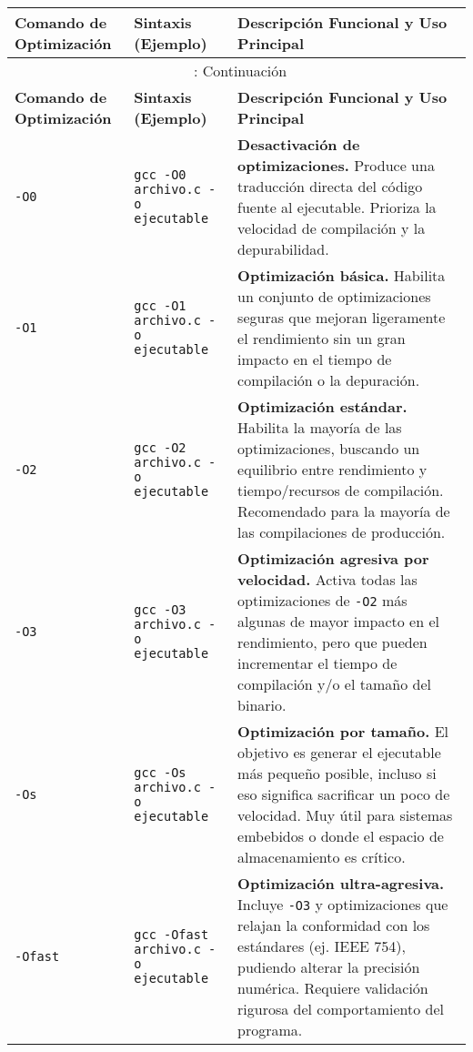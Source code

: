 \documentclass{article}
\begin{document}
	\begin{longtable}{l p{4.5cm} p{8cm}}
		\toprule
		\textbf{Comando de Optimización} & \textbf{Sintaxis (Ejemplo)} & \textbf{Descripción Funcional y Uso Principal} \\
		\midrule
		\endfirsthead
		\multicolumn{3}{c}{\tablename~\thetable{}: Continuación} \\
		\toprule
		\textbf{Comando de Optimización} & \textbf{Sintaxis (Ejemplo)} & \textbf{Descripción Funcional y Uso Principal} \\
		\midrule
		\endhead
		\bottomrule
		\endfoot
		\bottomrule
		\endlastfoot
		
		\texttt{-O0} & \texttt{gcc -O0 archivo.c -o ejecutable} & \textbf{Desactivación de optimizaciones.} Produce una traducción directa del código fuente al ejecutable. Prioriza la velocidad de compilación y la depurabilidad. \\
		\addlinespace
		\texttt{-O1} & \texttt{gcc -O1 archivo.c -o ejecutable} & \textbf{Optimización básica.} Habilita un conjunto de optimizaciones seguras que mejoran ligeramente el rendimiento sin un gran impacto en el tiempo de compilación o la depuración. \\
		\addlinespace
		\texttt{-O2} & \texttt{gcc -O2 archivo.c -o ejecutable} & \textbf{Optimización estándar.} Habilita la mayoría de las optimizaciones, buscando un equilibrio entre rendimiento y tiempo/recursos de compilación. Recomendado para la mayoría de las compilaciones de producción. \\
		\addlinespace
		\texttt{-O3} & \texttt{gcc -O3 archivo.c -o ejecutable} & \textbf{Optimización agresiva por velocidad.} Activa todas las optimizaciones de \texttt{-O2} más algunas de mayor impacto en el rendimiento, pero que pueden incrementar el tiempo de compilación y/o el tamaño del binario. \\
		\addlinespace
		\texttt{-Os} & \texttt{gcc -Os archivo.c -o ejecutable} & \textbf{Optimización por tamaño.} El objetivo es generar el ejecutable más pequeño posible, incluso si eso significa sacrificar un poco de velocidad. Muy útil para sistemas embebidos o donde el espacio de almacenamiento es crítico. \\
		\addlinespace
		\texttt{-Ofast} & \texttt{gcc -Ofast archivo.c -o ejecutable} & \textbf{Optimización ultra-agresiva.} Incluye \texttt{-O3} y optimizaciones que relajan la conformidad con los estándares (ej. IEEE 754), pudiendo alterar la precisión numérica. Requiere validación rigurosa del comportamiento del programa. \\

\end{longtable}
\end{document}
